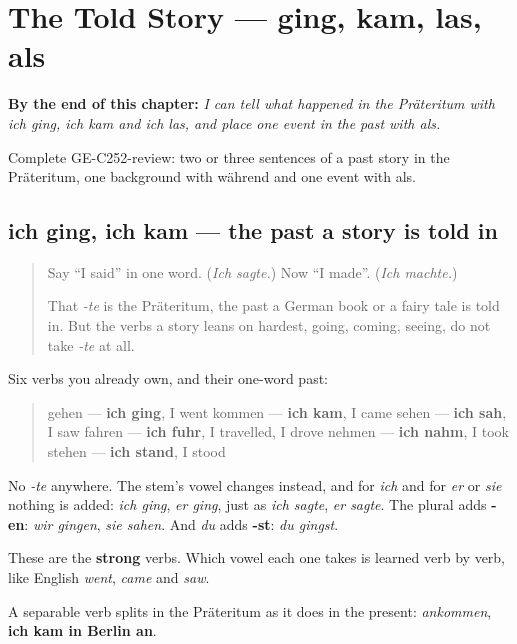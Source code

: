 
\chapter{The Told Story — ging, kam, las, als}
\label{ch:ge-the-told-story}

\begin{chapteropening}
\textbf{By the end of this chapter:} \emph{I can tell what happened in the Präteritum with ich ging, ich kam and ich las, and place one event in the past with als.}

Complete GE-C252-review: two or three sentences of a past story in the Präteritum, one background with während and one event with als.
\end{chapteropening}

\section[ich ging, ich kam, ich sah]{ich ging, ich kam — the past a story is told in}

\label{lesson:GE-C252-ich-ging}



\begin{quote}
Say \textquotedblleft{}I said\textquotedblright{} in one word. (\emph{Ich sagte.}) Now \textquotedblleft{}I made\textquotedblright{}. (\emph{Ich machte.})

That \emph{-te} is the Präteritum, the past a German book or a fairy tale is told in. But the verbs a story leans on hardest, going, coming, seeing, do not take \emph{-te} at all.
\end{quote}

\begin{grammarlens}[title={Grammar Lens: the vowel changes, and nothing is added}]
Six verbs you already own, and their one-word past:

\begin{quote}
gehen — \textbf{ich ging}, I went kommen — \textbf{ich kam}, I came sehen — \textbf{ich sah}, I saw fahren — \textbf{ich fuhr}, I travelled, I drove nehmen — \textbf{ich nahm}, I took stehen — \textbf{ich stand}, I stood
\end{quote}

No \emph{-te} anywhere. The stem's vowel changes instead, and for \emph{ich} and for \emph{er} or \emph{sie} nothing is added: \emph{ich ging}, \emph{er ging}, just as \emph{ich sagte}, \emph{er sagte}. The plural adds \textbf{-en}: \emph{wir gingen}, \emph{sie sahen}. And \emph{du} adds \textbf{-st}: \emph{du gingst}.

These are the \textbf{strong} verbs. Which vowel each one takes is learned verb by verb, like English \emph{went}, \emph{came} and \emph{saw}.

A separable verb splits in the Präteritum as it does in the present: \emph{ankommen}, \textbf{ich kam in Berlin an}.
\end{grammarlens}

